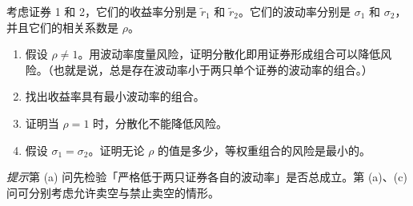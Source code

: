 \par\noindent\begin{minipage}{\linewidth}
\begin{problem}
 考虑证券 1 和 2，它们的收益率分别是 $\tilde{r}_{1}$ 和 $\tilde{r}_{2}$。它们的波动率分别是 $\sigma_{1}$ 和 $\sigma_{2}$，并且它们的相关系数是 $\rho$。
\begin{enumerate}[label=(\alph*)]
    \item 假设 $\rho\ne 1$。用波动率度量风险，证明分散化即用证券形成组合可以降低风险。（也就是说，总是存在波动率小于两只单个证券的波动率的组合。）
    \item 找出收益率具有最小波动率的组合。
    \item 证明当 $\rho=1$ 时，分散化不能降低风险。
    \item 假设 $\sigma_{1}=\sigma_{2}$。证明无论 $\rho$ 的值是多少，等权重组合的风险是最小的。
\end{enumerate}
\par\textit{提示}\quad 第 (a) 问先检验「严格低于两只证券各自的波动率」是否总成立。第 (a)、(c) 问可分别考虑允许卖空与禁止卖空的情形。
\end{problem}
\end{minipage}\par
{}
